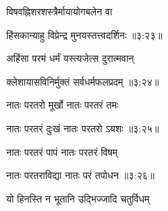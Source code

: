 {\devanagarifont विषवह्निशरशस्त्रैर्मायायोगबलेन वा \thinspace{\dandab} \dontdisplaylinenum }%


{\devanagarifont हिंसकान्याहु विप्रेन्द्र मुनयस्तत्त्वदर्शिनः {॥३:२३॥} \veg\dontdisplaylinenum }%



{\devanagarifont अहिंसा परमं धर्मं यस्त्यजेत्स दुरात्मवान् \thinspace{\dandab} \dontdisplaylinenum }%


{\devanagarifont क्लेशायासविनिर्मुक्तं सर्वधर्मफलप्रदम् {॥३:२४॥} \veg\dontdisplaylinenum }%
 
{\devanagarifont नातः परतरो मूर्खो नातः परतरं तमः \thinspace{\dandab} \dontdisplaylinenum }%


{\devanagarifont नातः परतरं दुःखं नातः परतरो ऽयशः {॥३:२५॥} \veg\dontdisplaylinenum }%
 
{\devanagarifont नातः परतरं पापं नातः परतरं विषम् \thinspace{\dandab} \dontdisplaylinenum }%
 

{\devanagarifont नातः परतराविद्या नातः परं तपोधन {॥३:२६॥} \veg\dontdisplaylinenum }%

{\devanagarifont यो हिनस्ति न भूतानि उद्भिज्जादि चतुर्विधम् \thinspace{\dandab} \dontdisplaylinenum }%

